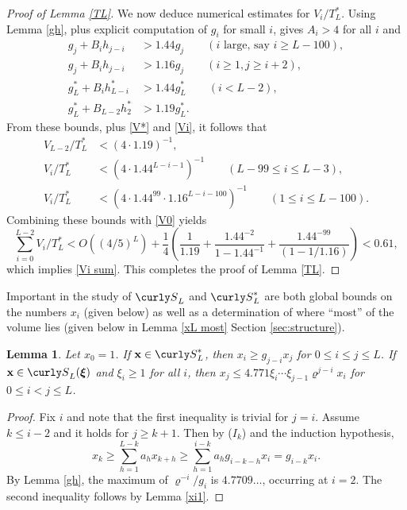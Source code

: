\documentclass[11pt]{amsart}
\theoremstyle{remark}
\theoremstyle{plain}
\newtheorem{lem}{Lemma}[section]
\numberwithin{equation}{section}
\renewcommand{\(}{\left(}
\renewcommand{\)}{\right)}
\newcommand{\fancyS}{{\curly S}}
\renewcommand{\le}{\leqslant}
\renewcommand{\ge}{\geqslant}
\renewcommand{\rho}{\varrho}
\newcommand{\bxi}{\boldsymbol\xi}
\newcommand{\vxi}{\bxi}
\newcommand{\vx}{\mathbf{x}}
\begin{document}
\begin{proof}[Proof of Lemma \ref{TL}]
We now deduce numerical estimates for $V_i/T_L^*$.
Using Lemma \ref{gh}, plus
explicit computation of $g_i$ for small $i$, gives $A_i > 4$ for all $i$ and
\begin{align*}
g_j + B_i h_{j-i} &> 1.44 g_j \qquad (i \text{ large, say } i \ge L-100), \\
g_j + B_i h_{j-i} &> 1.16 g_j \qquad (i\ge 1, j\ge i+2), \\
g_L^* + B_i h_{L-i}^* &> 1.44 g_L^* \qquad (i<L-2), \\
g_L^* + B_{L-2} h_2^* &> 1.19 g_L^*.
\end{align*}
From these bounds, plus \eqref{V*} and \eqref{Vi}, it follows that
\begin{align*}
V_{L-2}/T_L^* &< (4 \cdot 1.19)^{-1}, \\
V_i/T_L^* &< (4 \cdot 1.44^{L-i-1})^{-1} \qquad (L-99 \le i\le L-3), \\
V_i/T_L^* &< (4 \cdot 1.44^{99} \cdot 1.16^{L-i-100})^{-1} \qquad
(1 \le  i \le L-100).
\end{align*}
Combining these bounds with \eqref{V0} yields
$$
\sum_{i=0}^{L-2} V_i/T_L^* < O((4/5)^L) + \frac{1}{4} \( \frac{1}{1.19}
 + \frac{1.44^{-2}}{1-1.44^{-1}} +
 \frac{1.44^{-99}}{(1-1/1.16)} \) < 0.61,
$$
which implies \eqref{Vi sum}.  This completes the proof of Lemma
\ref{TL}.
\end{proof}

%
%
%
%

Important in the study of $\fancyS_L$ and $\fancyS_L^*$ are both global bounds on the
numbers $x_i$ (given below) as well as a determination of where ``most'' of the volume
lies (given below in Lemma \ref{xL most} Section \ref{sec:structure}).

\begin{lem}\label{xz}  Let $x_0=1$.  
If $\vx\in \fancyS_L^*$, then
$x_i \ge g_{j-i} x_j$ for $0\le i\le j\le L$.
If $\vx \in \fancyS_L(\vxi)$
and $\xi_i\ge 1$ for all $i$, then $x_j \le 
4.771 \xi_i \cdots \xi_{j-1} \rho^{j-i}x_i$ for $0\le i<j\le L$. 
\end{lem}

\begin{proof}
Fix $i$ and note that the first inequality is trivial
for $j=i$.
Assume $k\le i-2$ and it holds for $j\ge k+1$.  Then by ($I_k$) and the induction
hypothesis,
$$
x_k \ge \sum_{h=1}^{L-k} a_h x_{k+h} \ge \sum_{h=1}^{i-k} a_h g_{i-k-h} x_i
= g_{i-k} x_i.
$$
By Lemma \ref{gh},
the maximum of $\rho^{-i}/g_i$ is $4.7709\ldots$, occurring at $i=2$.
The second inequality follows by Lemma \ref{xi1}.
\end{proof}
\end{document}
